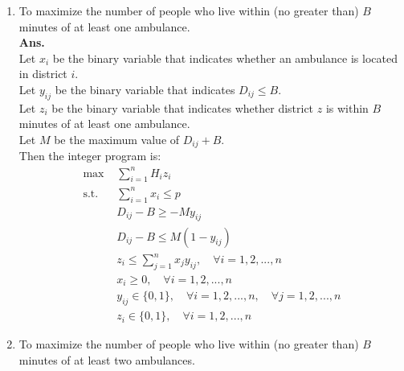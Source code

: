 \documentclass[14pt]{article}
\begin{document}
\begin{enumerate}
            \begin{enumerate}
                  \item To maximize the number of people who live within (no greater than) $B$ minutes of at least one ambulance.\\
                        \textbf{Ans. }\\
                        Let $x_{i}$ be the binary variable that indicates whether an ambulance is located in district $i$. \\
                        Let $y_{ij}$ be the binary variable that indicates $D_{ij} \leq B$. \\
                        Let $z_i$ be the binary variable that indicates whether district $z$ is within $B$ minutes of at least one ambulance. \\
                        Let $M$ be the maximum value of $D_{ij} + B$. \\
                        Then the integer program is:
                        \begin{align*}
                              \text{max }  & \sum_{i=1}^n H_iz_{i}                                                               \\
                              \text{s.t. } & \sum_{i=1}^n x_i \leq p                                                             \\
                                           & D_{ij} - B \geq -My_{ij}                                                            \\
                                           & D_{ij} - B \leq M(1-y_{ij})                                                         \\
                                           & z_i \leq \sum_{j=1}^nx_jy_{ij}, \quad \forall i = 1, 2, ..., n                      \\
                                           & x_i \geq 0 ,\quad \forall i = 1, 2, ..., n                                          \\
                                           & y_{ij} \in \{0, 1\}, \quad \forall i = 1, 2, ..., n, \quad \forall j = 1, 2, ..., n \\
                                           & z_i \in \{0, 1\}, \quad \forall i = 1, 2, ..., n
                        \end{align*}
                  \item To maximize the number of people who live within (no greater than) $B$ minutes of at least two ambulances.\\

\end{enumerate}
\end{enumerate}
\end{document}
